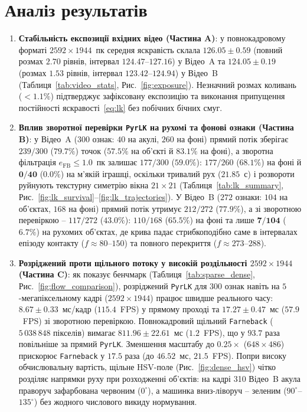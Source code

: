 \documentclass[14pt, a4paper]{extarticle}
\begin{document}
\clearpage
\section{Аналіз результатів}
\begin{enumerate}
    \item \textbf{Стабільність експозиції вхідних відео (Частина A)}: у повнокадровому форматі $2592 \times 1944$~пк середня яскравість склала $126.05 \pm 0.59$ (повний розмах $2.70$ рівнів, інтервал $124.47$--$127.16$) у Відео~A та $124.05 \pm 0.19$ (розмах $1.53$ рівнів, інтервал $123.42$--$124.94$) у Відео~B (Таблиця~\ref{tab:video_stats}, Рис.~\ref{fig:exposure}). Незначний розмах коливань ($< 1.1\%$) підтверджує зафіксовану експозицію та виконання припущення постійності яскравості~\eqref{eq:lk} без побічних бічних смуг.

    \item \textbf{Вплив зворотної перевірки \texttt{PyrLK} на рухомі та фонові ознаки (Частина B)}: у Відео~A ($300$ ознак: $40$ на акулі, $260$ на фоні) прямий потік зберігає $239/300$ ($79.7\%$) точок ($57.5\%$ на об'єкті й $83.1\%$ на фоні), а зворотна фільтрація $e_{\text{FB}} \le 1.0$~пк залишає $177/300$ ($59.0\%$): $177/260$ ($68.1\%$) на фоні й $\mathbf{0/40}$ ($\mathbf{0.0\%}$) на м'якій іграшці, оскільки тривалий рух ($21.85$~с) і розвороти руйнують текстурну симетрію вікна $21 \times 21$ (Таблиця~\ref{tab:lk_summary}, Рис.~\ref{fig:lk_survival}--\ref{fig:lk_trajectories}). У Відео~B ($272$ ознаки: $104$ на об'єктах, $168$ на фоні) прямий потік утримує $212/272$ ($77.9\%$), а зі зворотною перевіркою -- $117/272$ ($43.0\%$): $110/168$ ($65.5\%$) на фоні та лише $\mathbf{7/104}$ ($\mathbf{6.7\%}$) на рухомих об'єктах, де крива падає стрибкоподібно саме в інтервалах епізоду контакту ($f \approx 80$--$150$) та повного перекриття ($f \approx 273$--$288$).

    \item \textbf{Розріджений проти щільного потоку у високій роздільності $2592 \times 1944$ (Частина C)}: як показує бенчмарк (Таблиця~\ref{tab:sparse_dense}, Рис.~\ref{fig:flow_comparison}), розріджений \texttt{PyrLK} для $300$ ознак навіть на $5$-мегапіксельному кадрі ($2592 \times 1944$) працює швидше реального часу: $\mathbf{8.67 \pm 0.33}$~мс/кадр ($\mathbf{115.4}$~FPS) у прямому проході та $\mathbf{17.27 \pm 0.47}$~мс ($\mathbf{57.9}$~FPS) зі зворотною перевіркою. Повнокадровий щільний \texttt{Farneback} ($5\,038\,848$ пікселів) вимагає $\mathbf{811.96 \pm 22.61}$~мс ($\mathbf{1.2}$~FPS), що у $\mathbf{93.7}$ раза повільніше за прямий \texttt{PyrLK}. Зменшення масштабу до $0.25\times$ ($648 \times 486$) прискорює \texttt{Farneback} у $17.5$ раза (до $46.52$~мс, $21.5$~FPS). Попри високу обчислювальну вартість, щільне HSV-поле (Рис.~\ref{fig:dense_hsv}) чітко розділяє напрямки руху при розходженні об'єктів: на кадрі 310 Відео~B акула праворуч зафарбована червоним ($0^\circ$), а машинка вниз-ліворуч -- зеленим ($90^\circ$--$135^\circ$) без жодного числового викиду нормування.


\end{enumerate}
\end{document}
